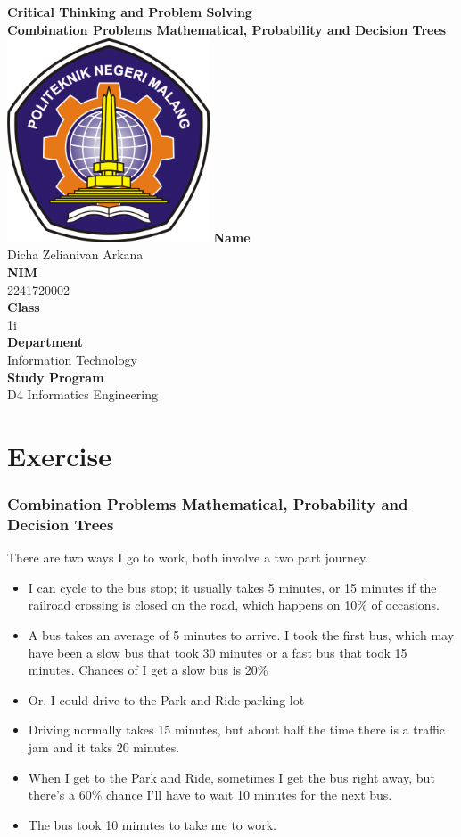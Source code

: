 \documentclass[12pt,titlepage]{article}
\newcommand{\vSubject}{Critical Thinking and Problem Solving}
\newcommand{\vSubtitle}{Combination Problems Mathematical, Probability and Decision Trees}
\newcommand{\vName}{Dicha Zelianivan Arkana}
\newcommand{\vNIM}{2241720002}
\newcommand{\vClass}{1i}
\newcommand{\vDepartment}{Information Technology}
\newcommand{\vStudyProgram}{D4 Informatics Engineering}
\begin{document}
\begin{titlepage}
    \centering
    \vfill
    {\bfseries\LARGE
        \vSubject\\
        \vskip0.25cm
        \vSubtitle
    }
    \vfill
    \includegraphics[width=6cm]{images/polinema-logo.png}
    \vfill
    {
        \textbf{Name}\\
        \vName\\
        \vskip0.5cm
        \textbf{NIM}\\
        \vNIM\\
        \vskip0.5cm
        \textbf{Class}\\
        \vClass\\
        \vskip0.5cm
        \textbf{Department}\\
        \vDepartment\\
        \vskip0.5cm
        \textbf{Study Program}\\
        \vStudyProgram
    }
\end{titlepage}

\section*{Exercise}
\subsubsection*{Combination Problems Mathematical, Probability and Decision Trees}
There are two ways I go to work, both involve a two part journey.
\begin{itemize}
    \item I can cycle to the bus stop; it usually takes 5 minutes, or 15 minutes if the railroad crossing is closed on the road, which happens on 10\% of occasions.
    \item A bus takes an average of 5 minutes to arrive. I took the first bus, which may have been a slow bus that took 30 minutes or a fast bus that took 15 minutes. Chances of I get a slow bus is 20\%
    \item Or, I could drive to the Park and Ride parking lot
    \item Driving normally takes 15 minutes, but about half the time there is a traffic jam and it taks 20 minutes.
    \item When I get to the Park and Ride, sometimes I get the bus right away, but there's a 60\% chance I'll have to wait 10 minutes for the next bus.
    \item The bus took 10 minutes to take me to work.
\end{itemize}
\end{document}
